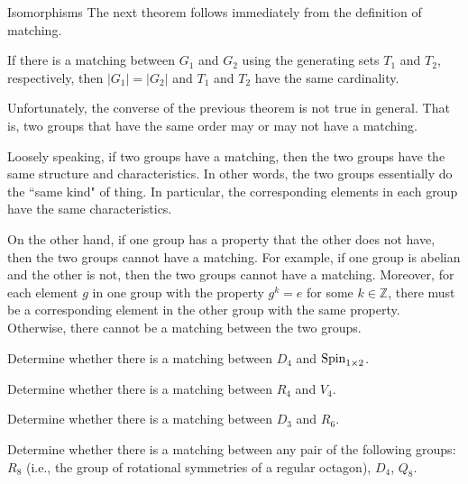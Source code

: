 \begin{section}{Isomorphisms}
The next theorem follows immediately from the definition of matching.

\begin{theorem}
If there is a matching between $G_1$ and $G_2$ using the generating sets $T_1$ and $T_2$, respectively, then $|G_1|=|G_2|$ and $T_1$ and $T_2$ have the same cardinality.
\end{theorem}

Unfortunately, the converse of the previous theorem is not true in general.  That is, two groups that have the same order may or may not have a matching.

Loosely speaking, if two groups have a matching, then the two groups have the same structure and characteristics.  In other words, the two groups essentially do the ``same kind" of thing.  In particular, the corresponding elements in each group have the same characteristics.

On the other hand, if one group has a property that the other does not have, then the two groups cannot have a matching.  For example, if one group is abelian and the other is not, then the two groups cannot have a matching.  Moreover, for each element $g$ in one group with the property $g^k=e$ for some $k\in \mathbb{Z}$, there must be a corresponding element in the other group with the same property. Otherwise, there cannot be a matching between the two groups.

\begin{problem}
Determine whether there is a matching between $D_4$ and $\operatorname{Spin}_{1\times 2}$.
\end{problem} 

\begin{problem}
Determine whether there is a matching between $R_4$ and $V_4$.
\end{problem}

\begin{problem}
Determine whether there is a matching between $D_3$ and $R_6$.
\end{problem}

\begin{problem}
Determine whether there is a matching between any pair of the following groups: $R_8$ (i.e., the group of rotational symmetries of a regular octagon), $D_4$, $Q_8$.
\end{problem}


\end{section}
